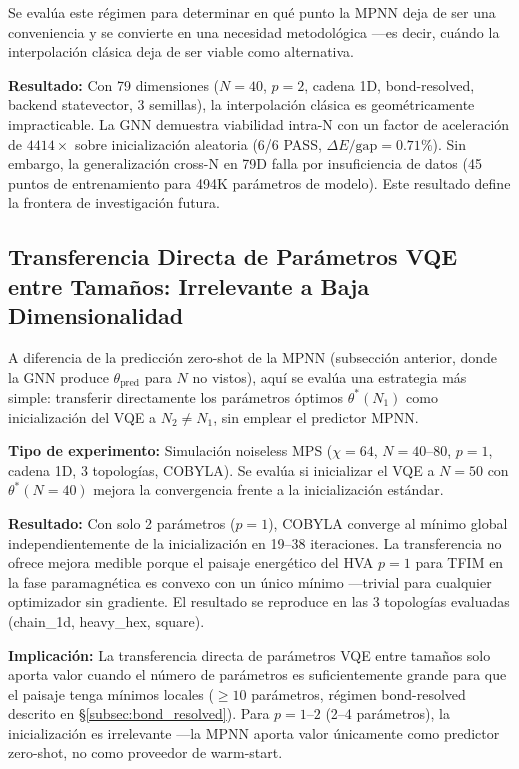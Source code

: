 \documentclass[11pt,a4paper,spanish]{book}
\begin{document}
Se evalúa este régimen para determinar en qué punto la MPNN deja de ser una conveniencia y se convierte en una necesidad metodológica ---es decir, cuándo la interpolación clásica deja de ser viable como alternativa.

\textbf{Resultado:} Con 79 dimensiones ($N = 40$, $p = 2$, cadena 1D, bond-resolved, backend statevector, 3 semillas), la interpolación clásica es geométricamente impracticable. La GNN demuestra viabilidad intra-N con un factor de aceleración de $4414\times$ sobre inicialización aleatoria (6/6 PASS, $\Delta E/\text{gap} = 0.71\%$). Sin embargo, la generalización cross-N en 79D falla por insuficiencia de datos (45 puntos de entrenamiento para 494K parámetros de modelo). Este resultado define la frontera de investigación futura.

\subsection{Transferencia Directa de Parámetros VQE entre Tamaños: Irrelevante a Baja Dimensionalidad}

A diferencia de la predicción zero-shot de la MPNN (subsección anterior, donde la GNN produce $\theta_{\text{pred}}$ para $N$ no vistos), aquí se evalúa una estrategia más simple: transferir directamente los parámetros óptimos $\theta^*(N_1)$ como inicialización del VQE a $N_2 \neq N_1$, sin emplear el predictor MPNN.

\textbf{Tipo de experimento:} Simulación noiseless MPS ($\chi = 64$, $N = 40$--$80$, $p = 1$, cadena 1D, 3 topologías, COBYLA). Se evalúa si inicializar el VQE a $N = 50$ con $\theta^*(N = 40)$ mejora la convergencia frente a la inicialización estándar.

\textbf{Resultado:} Con solo 2 parámetros ($p = 1$), COBYLA \citep{singh2025} converge al mínimo global independientemente de la inicialización en 19--38 iteraciones. La transferencia no ofrece mejora medible porque el paisaje energético del HVA $p = 1$ para TFIM en la fase paramagnética es convexo con un único mínimo ---trivial para cualquier optimizador sin gradiente. El resultado se reproduce en las 3 topologías evaluadas (chain\_1d, heavy\_hex, square).

\textbf{Implicación:} La transferencia directa de parámetros VQE entre tamaños solo aporta valor cuando el número de parámetros es suficientemente grande para que el paisaje tenga mínimos locales ($\geq 10$ parámetros, régimen bond-resolved descrito en §\ref{subsec:bond_resolved}). Para $p = 1$--$2$ (2--4 parámetros), la inicialización es irrelevante ---la MPNN aporta valor únicamente como predictor zero-shot, no como proveedor de warm-start.
\end{document}
